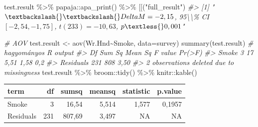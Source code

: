 \documentclass[
]{book}
\newenvironment{Shaded}{\begin{snugshade}}{\end{snugshade}}
\newcommand{\AttributeTok}[1]{\textcolor[rgb]{0.77,0.63,0.00}{#1}}
\newcommand{\CommentTok}[1]{\textcolor[rgb]{0.56,0.35,0.01}{\textit{#1}}}
\newcommand{\FunctionTok}[1]{\textcolor[rgb]{0.00,0.00,0.00}{#1}}
\newcommand{\NormalTok}[1]{#1}
\newcommand{\OtherTok}[1]{\textcolor[rgb]{0.56,0.35,0.01}{#1}}
\newcommand{\SpecialCharTok}[1]{\textcolor[rgb]{0.00,0.00,0.00}{#1}}
\newcommand{\StringTok}[1]{\textcolor[rgb]{0.31,0.60,0.02}{#1}}
\begin{document}
\begin{Shaded}
\begin{Highlighting}[]
\NormalTok{test.result }\SpecialCharTok{\%\textgreater{}\%}\NormalTok{ papaja}\SpecialCharTok{::}\FunctionTok{apa\_print}\NormalTok{() }\SpecialCharTok{\%\textgreater{}\%} \StringTok{\textasciigrave{}}\AttributeTok{[[}\StringTok{\textasciigrave{}}\NormalTok{(}\StringTok{"full\_result"}\NormalTok{)}
\CommentTok{\#\textgreater{} [1] "$\textbackslash{}\textbackslash{}Delta M = {-}2,15$, 95\textbackslash{}\textbackslash{}\% CI $[{-}2,54, {-}1,75]$, $t(233) = {-}10,63$, $p \textless{} 0,001$"}


\CommentTok{\# AOV}
\NormalTok{test.result }\OtherTok{\textless{}{-}} \FunctionTok{aov}\NormalTok{(Wr.Hnd}\SpecialCharTok{\textasciitilde{}}\NormalTok{Smoke, }\AttributeTok{data=}\NormalTok{survey)}
\FunctionTok{summary}\NormalTok{(test.result)   }\CommentTok{\# hagyományos R output}
\CommentTok{\#\textgreater{}              Df Sum Sq Mean Sq F value Pr(\textgreater{}F)}
\CommentTok{\#\textgreater{} Smoke         3     17    5,51    1,58    0,2}
\CommentTok{\#\textgreater{} Residuals   231    808    3,50               }
\CommentTok{\#\textgreater{} 2 observations deleted due to missingness}
\NormalTok{test.result }\SpecialCharTok{\%\textgreater{}\%}\NormalTok{ broom}\SpecialCharTok{::}\FunctionTok{tidy}\NormalTok{() }\SpecialCharTok{\%\textgreater{}\%}\NormalTok{ knitr}\SpecialCharTok{::}\FunctionTok{kable}\NormalTok{()}
\end{Highlighting}
\end{Shaded}

\begin{tabular}{l|r|r|r|r|r}
\hline
term & df & sumsq & meansq & statistic & p.value\\
\hline
Smoke & 3 & 16,54 & 5,514 & 1,577 & 0,1957\\
\hline
Residuals & 231 & 807,69 & 3,497 & NA & NA\\
\hline
\end{tabular}
\end{document}
